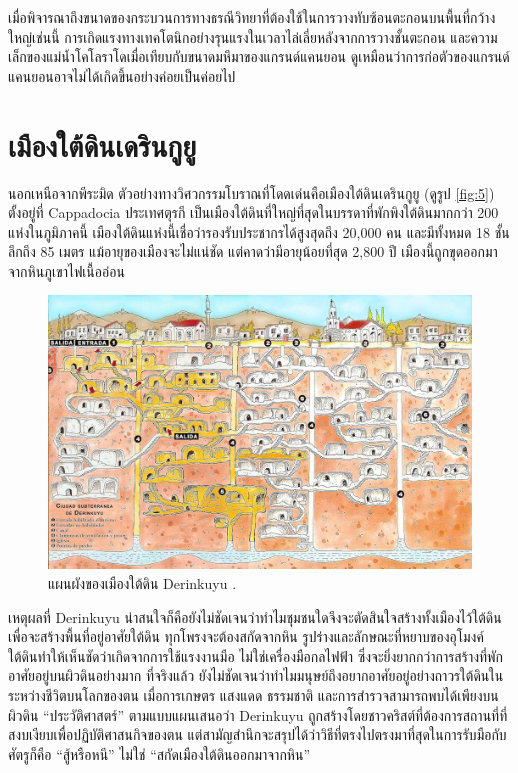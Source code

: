 \documentclass[10pt,twocolumn,letterpaper]{article}
\begin{document}
เมื่อพิจารณาถึงขนาดของกระบวนการทางธรณีวิทยาที่ต้องใช้ในการวางทับซ้อนตะกอนบนพื้นที่กว้างใหญ่เช่นนี้ การเกิดแรงทางเทคโตนิกอย่างรุนแรงในเวลาไล่เลี่ยหลังจากการวางชั้นตะกอน และความเล็กของแม่น้ำโคโลราโดเมื่อเทียบกับขนาดมหึมาของแกรนด์แคนยอน ดูเหมือนว่าการก่อตัวของแกรนด์แคนยอนอาจไม่ได้เกิดขึ้นอย่างค่อยเป็นค่อยไป

\section{เมืองใต้ดินเดรินกูยู}

นอกเหนือจากพีระมิด ตัวอย่างทางวิศวกรรมโบราณที่โดดเด่นคือเมืองใต้ดินเดรินกูยู (ดูรูป \ref{fig:5}) ตั้งอยู่ที่ Cappadocia ประเทศตุรกี เป็นเมืองใต้ดินที่ใหญ่ที่สุดในบรรดาที่พักพิงใต้ดินมากกว่า 200 แห่งในภูมิภาคนี้ \cite{54} เมืองใต้ดินแห่งนี้เชื่อว่ารองรับประชากรได้สูงสุดถึง 20,000 คน และมีทั้งหมด 18 ชั้น ลึกถึง 85 เมตร แม้อายุของเมืองจะไม่แน่ชัด แต่คาดว่ามีอายุน้อยที่สุด 2,800 ปี เมืองนี้ถูกขุดออกมาจากหินภูเขาไฟเนื้ออ่อน \cite{52, 53}

\begin{figure}[b]
\begin{center}

   \includegraphics[width=1\linewidth]{derinkuyu.jpeg}
\end{center}
   \caption{แผนผังของเมืองใต้ดิน Derinkuyu \cite{56}.}
\label{fig:5}
\label{fig:onecol}
\end{figure}

เหตุผลที่ Derinkuyu น่าสนใจก็คือยังไม่ชัดเจนว่าทำไมชุมชนใดจึงจะตัดสินใจสร้างทั้งเมืองไว้ใต้ดิน เพื่อจะสร้างพื้นที่อยู่อาศัยใต้ดิน ทุกโพรงจะต้องสกัดจากหิน รูปร่างและลักษณะที่หยาบของอุโมงค์ใต้ดินทำให้เห็นชัดว่าเกิดจากการใช้แรงงานมือ ไม่ใช่เครื่องมือกลไฟฟ้า ซึ่งจะยิ่งยากกว่าการสร้างที่พักอาศัยอยู่บนผิวดินอย่างมาก ที่จริงแล้ว ยังไม่ชัดเจนว่าทำไมมนุษย์ถึงอยากอาศัยอยู่อย่างถาวรใต้ดินในระหว่างชีวิตบนโลกของตน เมื่อการเกษตร แสงแดด ธรรมชาติ และการสำรวจสามารถพบได้เพียงบนผิวดิน “ประวัติศาสตร์” ตามแบบแผนเสนอว่า Derinkuyu ถูกสร้างโดยชาวคริสต์ที่ต้องการสถานที่ที่สงบเงียบเพื่อปฏิบัติศาสนกิจของตน \cite{53} แต่สามัญสำนึกจะสรุปได้ว่าวิธีที่ตรงไปตรงมาที่สุดในการรับมือกับศัตรูก็คือ “สู้หรือหนี” ไม่ใช่ “สกัดเมืองใต้ดินออกมาจากหิน”
\end{document}
